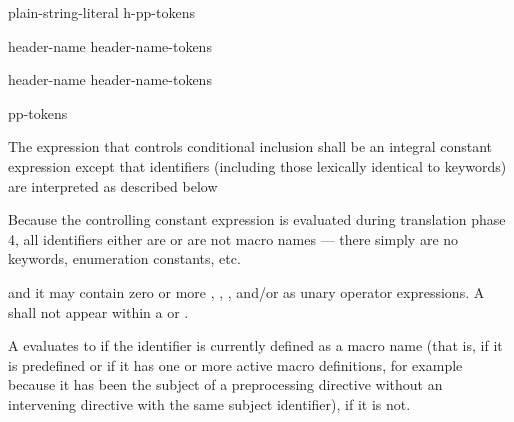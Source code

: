 \begin{bnf}
\br
    plain-string-literal\br
    \terminal{<} h-pp-tokens \terminal{>}
\end{bnf}

%
\begin{bnf}
\br
     \terminal{(} header-name \terminal{)}\br
     \terminal{(} header-name-tokens \terminal{)}
\end{bnf}

%
\begin{bnf}
\br
     \terminal{(} header-name  \terminal{)}\br
     \terminal{(} header-name-tokens  \terminal{)}
\end{bnf}

%
\begin{bnf}
\br
     pp-tokens \terminal{)}
\end{bnf}

\pnum
The expression that controls conditional inclusion
shall be an integral constant expression except that
identifiers
(including those lexically identical to keywords)
are interpreted as described below
\begin{footnote}
Because the controlling constant expression is evaluated
during translation phase 4,
all identifiers either are or are not macro names ---
there simply are no keywords, enumeration constants, etc.
\end{footnote}
and it may contain zero or more
,
,
,
and/or 
as unary operator expressions.
A  shall not appear
within a  or .

\pnum
A  evaluates to 
if the identifier is currently defined
as a macro name
(that is, if it is predefined
or if it has one or more active macro definitions,
for example because
it has been the subject of a
preprocessing directive
without an intervening
directive with the same subject identifier),  if it is not.

